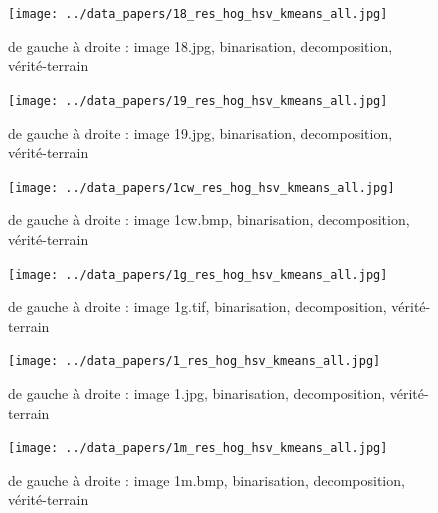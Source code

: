 \documentclass{book}
\begin{document}
\begin{figure}[H]
\begin{center}
\texttt{[image: ../data\_papers/18\_res\_hog\_hsv\_kmeans\_all.jpg]}
\end{center}
\caption{de gauche à droite : image 18.jpg, binarisation, decomposition, vérité-terrain}
\label{18}
\end{figure}
\clearpage


\begin{figure}[H]
\begin{center}
\texttt{[image: ../data\_papers/19\_res\_hog\_hsv\_kmeans\_all.jpg]}
\end{center}
\caption{de gauche à droite : image 19.jpg, binarisation, decomposition, vérité-terrain}
\label{19}
\end{figure}
\clearpage


\begin{figure}[H]
\begin{center}
\texttt{[image: ../data\_papers/1cw\_res\_hog\_hsv\_kmeans\_all.jpg]}
\end{center}
\caption{de gauche à droite : image 1cw.bmp, binarisation, decomposition, vérité-terrain}
\label{1cw}
\end{figure}
\clearpage


\begin{figure}[H]
\begin{center}
\texttt{[image: ../data\_papers/1g\_res\_hog\_hsv\_kmeans\_all.jpg]}
\end{center}
\caption{de gauche à droite : image 1g.tif, binarisation, decomposition, vérité-terrain}
\label{1g}
\end{figure}
\clearpage


\begin{figure}[H]
\begin{center}
\texttt{[image: ../data\_papers/1\_res\_hog\_hsv\_kmeans\_all.jpg]}
\end{center}
\caption{de gauche à droite : image 1.jpg, binarisation, decomposition, vérité-terrain}
\label{1}
\end{figure}
\clearpage


\begin{figure}[H]
\begin{center}
\texttt{[image: ../data\_papers/1m\_res\_hog\_hsv\_kmeans\_all.jpg]}
\end{center}
\caption{de gauche à droite : image 1m.bmp, binarisation, decomposition, vérité-terrain}
\label{1m}
\end{figure}
\clearpage
\end{document}

